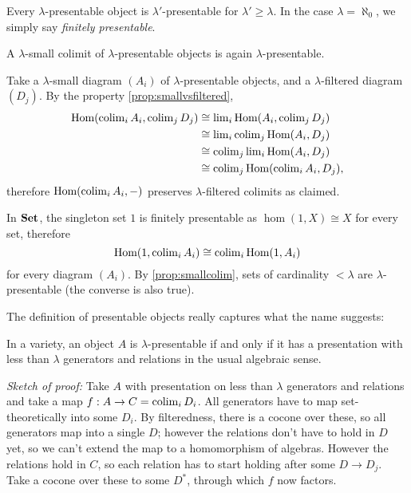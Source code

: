 Every $\lambda$-presentable object is $\lambda'$-presentable for $\lambda' \geq \lambda$. In the case $\lambda=\aleph_0$, we simply say \emph{finitely presentable}. \\

\begin{Lemma}\label{prop:smallcolim} A $\lambda$-small colimit of $\lambda$-presentable objects is again $\lambda$-presentable.
\end{Lemma}
\begin{Proof}
Take a $\lambda$-small diagram $(A_i)$ of $\lambda$-presentable objects, and a $\lambda$-filtered diagram $(D_j)$. By the property \ref{prop:smallvsfiltered},
\begin{align*}
\textrm{Hom}(\operatorname{colim}_i A_i, \operatorname{colim}_j D_j) &\cong \operatorname{lim}_i \textrm{Hom}(A_i, \operatorname{colim}_j D_j) \\
&\cong \operatorname{lim}_i \operatorname{colim}_j \textrm{Hom}(A_i, D_j) \\
&\cong \operatorname{colim}_j \operatorname{lim}_i \textrm{Hom}(A_i, D_j) \\
&\cong \operatorname{colim}_j \textrm{Hom}(\operatorname{colim}_i A_i, D_j),
\end{align*}
therefore $\textrm{Hom}(\operatorname{colim}_i A_i, -)$ preserves $\lambda$-filtered colimits as claimed.
\end{Proof}

\begin{Example}
In $\mathbf{Set}$, the singleton set $1$ is finitely presentable as $\hom(1,X) \cong X$ for every set, therefore
\[ \textrm{Hom}(1,\operatorname{colim}_i A_i) \cong \operatorname{colim}_i \textrm{Hom}(1,A_i) \]
for every diagram $(A_i)$. By \ref{prop:smallcolim}, sets of cardinality $< \lambda$ are $\lambda$-presentable (the converse is also true).
\end{Example}

The definition of presentable objects really captures what the name suggests: 

\begin{Proposition}\label{prop:varietypresentable} In a variety, an object $A$ is $\lambda$-presentable if and only if it has a presentation with less than $\lambda$ generators and relations in the usual algebraic sense. \cite[Chapter 3.A]{AdamekRosicky}
\end{Proposition}
\textit{Sketch of proof:} Take $A$ with presentation on less than $\lambda$ generators and relations and take a map $f : A \to C = \operatorname{colim}_i D_i$. All generators have to map set-theoretically into some $D_i$. By filteredness, there is a cocone over these, so all generators map into a single $D$; however the relations don't have to hold in $D$ yet, so we can't extend the map to a homomorphism of algebras. However the relations hold in $C$, so each relation has to start holding after some $D \to D_j$. Take a cocone over these to some $D^*$, through which $f$ now factors. \\

